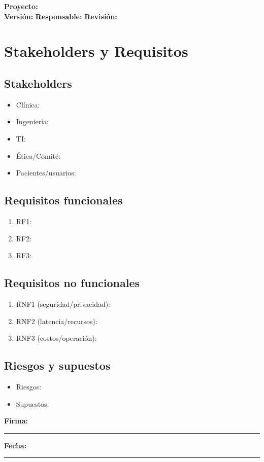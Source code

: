 \documentclass[11pt]{article}
\newcommand{\project}{\textbf{Proyecto:} \underline{\hspace{7cm}}}
\newcommand{\version}{\textbf{Versi\'on:} \underline{\hspace{3cm}}}
\newcommand{\owner}{\textbf{Responsable:} \underline{\hspace{5cm}}}
\newcommand{\review}{\textbf{Revisi\'on:} \underline{\hspace{3cm}}}
\newcommand{\signatureline}{\vspace{0.5cm}\noindent\textbf{Firma:}\ \rule{6cm}{0.4pt} \hfill \textbf{Fecha:}\ \rule{3cm}{0.4pt}}
\begin{document}
\begin{flushright}
\project \\ \version \hspace{1cm} \owner \hspace{1cm} \review
\end{flushright}


\section*{Stakeholders y Requisitos}
\subsection*{Stakeholders}
\begin{itemize}
  \item Cl\'inica: \underline{\hspace{8cm}}
  \item Ingenier\'ia: \underline{\hspace{7.8cm}}
  \item TI: \underline{\hspace{9.2cm}}
  \item \'Etica/Comit\'e: \underline{\hspace{6.8cm}}
  \item Pacientes/usuarios: \underline{\hspace{6.1cm}}
\end{itemize}

\subsection*{Requisitos funcionales}
\begin{enumerate}
  \item RF1: 
  \item RF2: 
  \item RF3: 
\end{enumerate}

\subsection*{Requisitos no funcionales}
\begin{enumerate}
  \item RNF1 (seguridad/privacidad): 
  \item RNF2 (latencia/recursos): 
  \item RNF3 (costos/operaci\'on): 
\end{enumerate}

\subsection*{Riesgos y supuestos}
\begin{itemize}
  \item Riesgos: 
  \item Supuestos: 
\end{itemize}
\signatureline

\label{LastPage}
\end{document}
